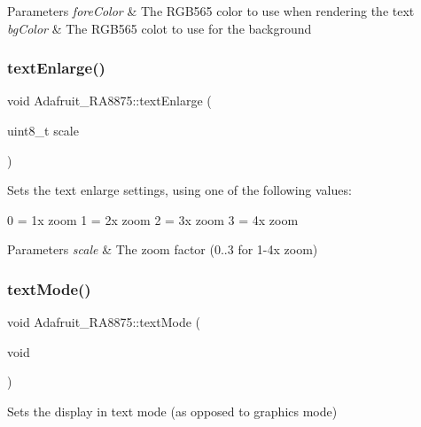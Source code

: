 \begin{DoxyParams}{Parameters}
{\em fore\+Color} & The R\+G\+B565 color to use when rendering the text \\
\hline
{\em bg\+Color} & The R\+G\+B565 colot to use for the background \\
\hline
\end{DoxyParams}
\mbox{\label{class_adafruit___r_a8875_a960a7ed5b834a0d058059cbc15412387}} 
\subsubsection{\texorpdfstring{textEnlarge()}{textEnlarge()}}
{\footnotesize\ttfamily void Adafruit\+\_\+\+R\+A8875\+::text\+Enlarge (\begin{DoxyParamCaption}\item[{uint8\+\_\+t}]{scale }\end{DoxyParamCaption})}

Sets the text enlarge settings, using one of the following values\+:

0 = 1x zoom 1 = 2x zoom 2 = 3x zoom 3 = 4x zoom


\begin{DoxyParams}{Parameters}
{\em scale} & The zoom factor (0..3 for 1-\/4x zoom) \\
\hline
\end{DoxyParams}
\mbox{\label{class_adafruit___r_a8875_a4213dbf041641172b7bac40e3b451da5}} 
\subsubsection{\texorpdfstring{textMode()}{textMode()}}
{\footnotesize\ttfamily void Adafruit\+\_\+\+R\+A8875\+::text\+Mode (\begin{DoxyParamCaption}\item[{void}]{ }\end{DoxyParamCaption})}

Sets the display in text mode (as opposed to graphics mode) \mbox{\label{class_adafruit___r_a8875_a9bf7b027ee1a23f514d16995171dd027}} 
